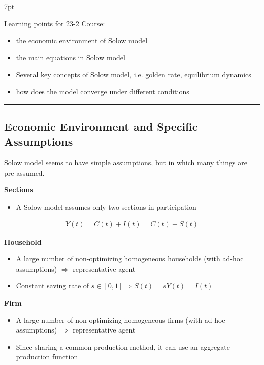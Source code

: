 \documentclass{article}
\providecommand{\tightlist}{
  \setlength{\itemsep}{0pt}
  \setlength{\parskip}{0pt}}
\newcommand*\sepline{%
  \begin{center}
    \rule[1ex]{.5\textwidth}{.5pt}
  \end{center}}
\newenvironment{greenblock}{%
\def\FrameCommand{%
  \hspace{1pt}%
    {\color{Green}%
    \vrule width 2pt}%
    {\color{greenshade}%
    \vrule width 4pt}%
  \colorbox{greenshade}%
}%
\MakeFramed{%
  \advance%
  \hsize-%
  \width%
  \FrameRestore}%
\noindent\hspace{-4.55pt}%
\begin{adjustwidth}{}{7pt}%
\vspace{2pt}\vspace{2pt}%
}
{%
\vspace{2pt}\end{adjustwidth}\endMakeFramed%
}
\begin{document}
\begin{greenblock}
Learning points for 23-2 Course:
\begin{itemize}
\tightlist
  \item the economic environment of Solow model
  \item the main equations in Solow model
  \item Several key concepts of Solow model, i.e. golden rate, equilibrium dynamics
  \item how does the model converge under different conditions
\end{itemize}
\end{greenblock}

\sepline
\subsection{Economic Environment and Specific Assumptions}\label{economic-environment-and-specific-assumptions}

Solow model seems to have simple assumptions, but in which many things are pre-assumed.

\textbf{Sections} 

\begin{itemize}
  \item A Solow model assumes only two sections in participation 
\end{itemize}

\begin{align}
Y(t)=C(t)+I(t)=C(t)+S(t)
\end{align}

\textbf{Household} 

\begin{itemize}
\tightlist
  \item A large number of non-optimizing homogeneous households (with ad-hoc assumptions) $\Rightarrow$ representative agent 
  \item Constant saving rate of $s\in [0,1] \Rightarrow S(t)=sY(t)=I(t)$
\end{itemize}


\textbf{Firm} 

\begin{itemize}
\tightlist
  \item A large number of non-optimizing homogeneous firms (with
ad-hoc assumptions) $\Rightarrow$ representative agent 
  \item Since sharing a common production method, it can use an aggregate production function
\end{itemize}
\end{document}
